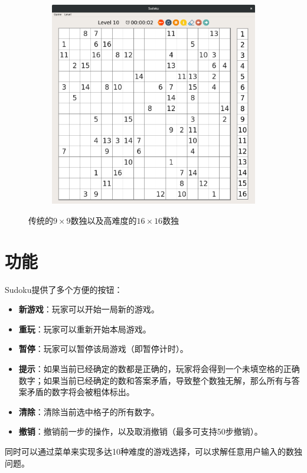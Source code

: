 \documentclass[11pt,a4paper]{article}
\begin{document}
\begin{figure}[H]
\begin{subfigure}{.45\textwidth}
		\includegraphics[width=\linewidth]{sudoku-4a.png}
	\end{subfigure}
	\caption{传统的$9\times 9$数独以及高难度的$16\times 16$数独}
\end{figure}

\section{功能}
Sudoku提供了多个方便的按钮：
\begin{itemize}
	\item \textbf{新游戏}：玩家可以开始一局新的游戏。
	\item \textbf{重玩}：玩家可以重新开始本局游戏。
	\item \textbf{暂停}：玩家可以暂停该局游戏（即暂停计时）。
	\item \textbf{提示}：如果当前已经确定的数都是正确的，玩家将会得到一个未填空格的正确数字；如果当前已经确定的数和答案矛盾，导致整个数独无解，那么所有与答案矛盾的数字将会被粗体标出。
	\item \textbf{清除}：清除当前选中格子的所有数字。
	\item \textbf{撤销}：撤销前一步的操作，以及取消撤销（最多可支持50步撤销）。
\end{itemize}

同时可以通过菜单来实现多达10种难度的游戏选择，可以求解任意用户输入的数独问题。
\end{document}
